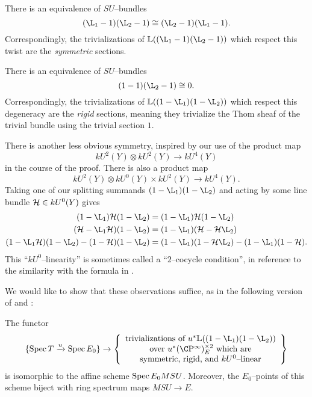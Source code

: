 \begin{example}
There is an equivalence of $SU$--bundles \[(\L_1 - 1)(\L_2 - 1) \cong (\L_2 - 1)(\L_1 - 1).\]  Correspondingly, the trivializations of $\ThomSheaf{(\L_1 - 1)(\L_2 - 1)}$ which respect this twist are the \emph{symmetric} sections.
\end{example}

\begin{example}
There is an equivalence of $SU$--bundles \[(1 - 1)(\L_2 - 1) \cong 0.\]  Correspondingly, the trivializations of $\ThomSheaf{(1 - \L_1)(1 - \L_2)}$ which respect this degeneracy are the \emph{rigid} sections, meaning they trivialize the Thom sheaf of the trivial bundle using the trivial section $1$.
\end{example}

\begin{example}\label{TwoCocycleConditionForBSUBundles}
There is another less obvious symmetry, inspired by our use of the product map \[kU^2(Y) \otimes kU^2(Y) \to kU^4(Y)\] in the course of the proof.  There is also a product map \[kU^2(Y) \otimes kU^0(Y) \times kU^2(Y) \to kU^4(Y).\]  Taking one of our splitting summands $(1 - \L_1)(1 - \L_2)$ and acting by some line bundle $\mathcal{H} \in kU^0(Y)$ gives
\begin{align*}
(1 - \L_1)\sheaf H(1 - \L_2) & = (1 - \L_1)\sheaf H(1 - \L_2) \\
(\sheaf H - \L_1 \sheaf H)(1 - \L_2) & = (1 - \L_1)(\sheaf H - \sheaf H \L_2) \\
(1 - \L_1 \sheaf H)(1 - \L_2) - (1 - \sheaf H)(1 - \L_2) & = (1 - \L_1)(1 - \sheaf H \L_2) - (1 - \L_1)(1 - \sheaf H).
\end{align*}
This ``$kU^0$--linearity'' is sometimes called a ``$2$--cocycle condition'', in reference to the similarity with the formula in .
\end{example}

We would like to show that these observations suffice, as in the following version of  and :
\begin{theorem}\label{BSUTriumvirate}
The functor \[\{\Spec T \xrightarrow{u} \Spec E_0\} \to \left\{ \begin{array}{c} \text{trivializations of $u^* \ThomSheaf{(1 - \L_1)(1 - \L_2)}$} \\ \text{over $u^* (\CP^\infty)^{\times 2}_E$ which are} \\ \text{symmetric, rigid, and $kU^0$--linear} \end{array} \right\}\] is isomorphic to the affine scheme $\operatorname{Spec} E_0 MSU$.  Moreover, the $E_0$--points of this scheme biject with ring spectrum maps $MSU \to E$.
\end{theorem}

